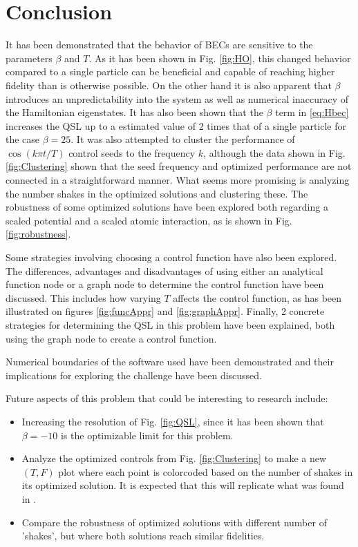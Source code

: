 \documentclass[aps,pra,reprint,superscriptaddress]{revtex4-1}
\begin{document}
\section{\label{sec:conclusion}Conclusion}
It has been demonstrated that the behavior of BECs are sensitive to the parameters $\beta$ and $T$. As it has been shown in Fig. \ref{fig:HO}, this changed behavior compared to a single particle can be beneficial and capable of reaching higher fidelity than is otherwise possible. On the other hand it is also apparent that $\beta$ introduces an unpredictability into the system as well as numerical inaccuracy of the Hamiltonian eigenstates. It has also been shown that the $\beta$ term in \eqref{eq:Hbec} increases the QSL up to a estimated value of 2 times that of a single particle for the case $\beta=25$. It was also attempted to cluster the performance of $\cos(k\pi t/T)$ control seeds to the frequency $k$, although the data shown in Fig. \ref{fig:Clustering} shown that the seed frequency and optimized performance are not connected in a straightforward manner. What seems more promising is analyzing the number shakes in the optimized solutions and clustering these. The robustness of some optimized solutions have been explored both regarding a scaled potential and a scaled atomic interaction, as is shown in Fig. \ref{fig:robustness}.

Some strategies involving choosing a control function have also been explored. The differences, advantages and disadvantages of using either an analytical function node or a graph node to determine the control function have been discussed. This includes how varying $T$ affects the control function, as has been illustrated on figures \ref{fig:funcAppr} and \ref{fig:graphAppr}. Finally, 2 concrete strategies for determining the QSL in this problem have been explained, both using the graph node to create a control function.

Numerical boundaries of the software used have been demonstrated and their implications for exploring the challenge have been discussed.

Future aspects of this problem that could be interesting to research include:
\begin{itemize}
	\item Increasing the resolution of Fig. \ref{fig:QSL}, since it has been shown that $\beta=-10$ is the optimizable limit for this problem.
	\item Analyze the optimized controls from Fig. \ref{fig:Clustering} to make a new $(T,F)$ plot where each point is colorcoded based on the number of shakes in its optimized solution. It is expected that this will replicate what was found in \cite{QM2Paper}.
	\item Compare the robustness of optimized solutions with different number of 'shakes', but where both solutions reach similar fidelities.
\end{itemize}


\end{document}
